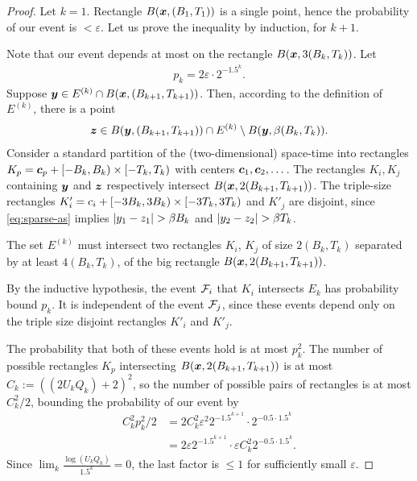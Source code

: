 \documentclass[12pt]{memoir}
\renewcommand{\le}{\leq}
\def\B{B}
\def\U{U}
\newcommand{\Tu}{T}
\begin{document}
\begin{proof}
Let \( k=1 \).
Rectangle \( B(\vek{x},(\B_1, \Tu_{1})) \) is a single point, hence
the probability of our event is \( <\varepsilon \).
Let us prove the inequality by induction, for \( k+1 \).

Note that our 
event depends at most on the rectangle \( B(\vek{x},3(\B_{k}, \Tu_{k})) \).
Let
\begin{align*}
   p_{k}=2\varepsilon\cdot 2^{-1.5^{k}}.
\end{align*}
Suppose \( \vek{y} \in E^{(k)}\cap B(\vek{x},(\B_{k+1}, \Tu_{k+1})  ) \).
Then, according to the definition of \( E^{(k)} \),  there is a point
\begin{align}\label{eq:sparse-as}
 \vek{z} \in
 B(\vek{y},(\B_{k+1},\Tu_{k+1}))\cap E^{(k)}\setminus B(\vek{y},\beta(\B_{k}, \Tu_{k})).
 \end{align}
Consider a standard partition of the (two-dimensional) space-time into
rectangles \( K_{p}=\vek{c}_{p}+\lint{-\B_{k}}{\B_k}\times \lint{-\Tu_{k}}{\Tu_{k}} \)
with centers \( \boldsymbol{c}_{1},\boldsymbol{c}_{2},\dots \).
The rectangles \( K_{i},K_{j} \) containing \( \boldsymbol{y} \) and \( \boldsymbol{z} \)
respectively intersect \( B(\vek{x}, 2(\B_{k+1}, \Tu_{k+1})) \).
The triple-size rectangles 
\( K'_{i}=c_{i} + \lint{-3\B_{k}}{3\B_k}\times \lint{-3\Tu_{k}}{3\Tu_{k}} \) and
\( K'_{j} \) are disjoint, since \eqref{eq:sparse-as} implies
 \( \abs{y_1 - z_1}>\beta\B_{k} \) and \( \abs{y_2 - z_2}>\beta\Tu_{k} \).

The set \( E^{(k)} \) must intersect two rectangles \( K_{i} \),
\( K_{j} \) of size \( 2(\B_{k}, \Tu_{k}) \) separated by at least \( 4(\B_{k}, \Tu_{k}) \),
of the big rectangle \( B(\vek{x},2(\B_{k+1}, \Tu_{k+1})) \).

By the inductive hypothesis, the event \( \mathcal{F}_{i} \) that
\( K_{i} \) intersects \( E_{k} \) has probability bound \( p_{k} \).
It is independent of the event \( \mathcal{F}_{j} \), since these events depend
only on the triple size disjoint rectangles \( K'_{i} \) and \( K'_{j} \).

The probability that both of these events hold is at most \( p_{k}^{2} \).
The number of possible rectangles
\( K_{p} \) intersecting \( B(\vek{x},2(\B_{k+1}, \Tu_{k+1})) \) is
at most
\( C_{k}:=((2\U_{k} Q_{k})+2)^{2} \), so the number of possible pairs of rectangles
is at most \( C_{k}^{2}/2 \), bounding the probability of our event by
 \begin{align*}
   C_{k}^{2}p_{k}^{2}/2
    &=
      2 C_{k}^{2}\varepsilon^{2} 2^{-1.5^{k+1}}\cdot 2^{-0.5\cdot 1.5^{k}}
   \\ &=2\varepsilon 2^{-1.5^{k+1}} \cdot \varepsilon
        C_{k}^{2}2^{-0.5\cdot 1.5^{k}}.
 \end{align*}
Since \( \lim_{k}\frac{\log{(\U_{k} Q_k)}}{1.5^k}=0 \),
the last factor is \( \le 1 \) for sufficiently small  \( \varepsilon \).
\end{proof}
\end{document}
